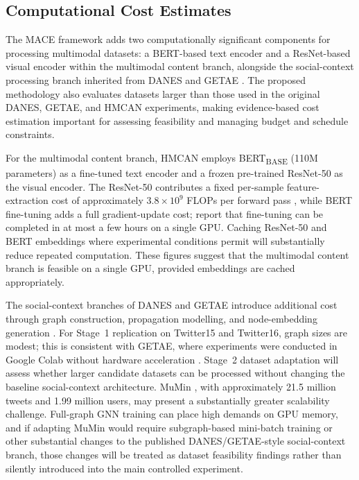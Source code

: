\subsection{Computational Cost Estimates}
\label{sec:computecost}

The MACE framework adds two computationally significant components for processing multimodal datasets: a BERT-based text encoder and a ResNet-based visual encoder within the multimodal content branch, alongside the social-context processing branch inherited from DANES \citep{truica2024danes} and GETAE \citep{GETAE2025}. The proposed methodology also evaluates datasets larger than those used in the original DANES, GETAE, and HMCAN experiments, making evidence-based cost estimation important for assessing feasibility and managing budget and schedule constraints.

For the multimodal content branch, HMCAN \citep{Qian2021} employs BERT\textsubscript{BASE} (110M parameters) as a fine-tuned text encoder and a frozen pre-trained ResNet-50 as the visual encoder. The ResNet-50 contributes a fixed per-sample feature-extraction cost of approximately $3.8 \times 10^{9}$ FLOPs per forward pass \citep{He2016}, while BERT fine-tuning adds a full gradient-update cost; \citet{Devlin2019} report that fine-tuning can be completed in at most a few hours on a single GPU. Caching ResNet-50 and BERT embeddings where experimental conditions permit will substantially reduce repeated computation. These figures suggest that the multimodal content branch is feasible on a single GPU, provided embeddings are cached appropriately.

The social-context branches of DANES and GETAE introduce additional cost through graph construction, propagation modelling, and node-embedding generation \citep{truica2024danes, GETAE2025}. For Stage~1 replication on Twitter15 and Twitter16, graph sizes are modest; this is consistent with GETAE, where experiments were conducted in Google Colab without hardware acceleration \citep{GETAE2025}. Stage~2 dataset adaptation will assess whether larger candidate datasets can be processed without changing the baseline social-context architecture. MuMin \citep{mumindataset}, with approximately 21.5 million tweets and 1.99 million users, may present a substantially greater scalability challenge. Full-graph GNN training can place high demands on GPU memory, and if adapting MuMin would require subgraph-based mini-batch training or other substantial changes to the published DANES/GETAE-style social-context branch, those changes will be treated as dataset feasibility findings rather than silently introduced into the main controlled experiment.

